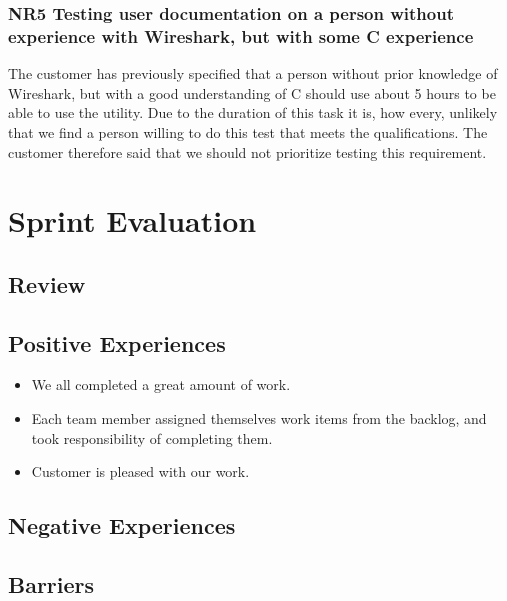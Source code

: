\subsubsection{NR5 Testing user documentation on a person without experience with Wireshark, but with some C experience}
The customer has previously specified that a person without prior knowledge of Wireshark, but with a good understanding of C should use about 5 hours to be able to use the utility. Due to the duration of this task it is, how every, unlikely that we find a person willing to do this test that meets the qualifications. The customer therefore said that we should not prioritize testing this requirement.

\section{Sprint Evaluation}
\label{sec:sp4eval}
\subsection{Review}


\subsection{Positive Experiences}
\begin{itemize}
\item We all completed a great amount of work.
\item Each team member assigned themselves work items from the backlog, and took responsibility of completing them.
\item Customer is pleased with our work.   
\end{itemize}

\subsection{Negative Experiences}

\subsection{Barriers}


